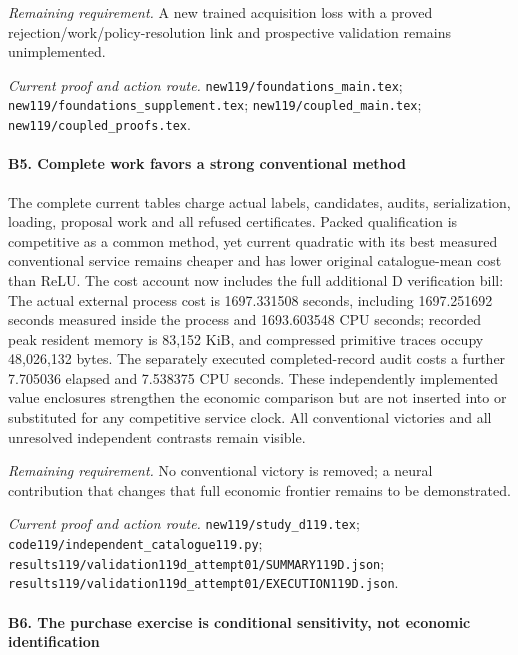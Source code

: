 \par\emph{Remaining requirement.} A new trained acquisition loss with a proved rejection/\allowbreak{}work/\allowbreak{}policy-resolution link and prospective validation remains unimplemented.

\par\emph{Current proof and action route.} \nolinkurl{new119/foundations_main.tex}; \nolinkurl{new119/foundations_supplement.tex}; \nolinkurl{new119/coupled_main.tex}; \nolinkurl{new119/coupled_proofs.tex}.

\paragraph{B5. Complete work favors a strong conventional method}

The complete current tables charge actual labels, candidates, audits, serialization, loading, proposal work and all refused certificates. Packed qualification is competitive as a common method, yet current quadratic with its best measured conventional service remains cheaper and has lower original catalogue-mean cost than ReLU. The cost account now includes the full additional D verification bill: The actual external process cost is 1697.331508 seconds, including 1697.251692 seconds measured inside the process and 1693.603548 CPU seconds; recorded peak resident memory is 83,152 KiB, and compressed primitive traces occupy 48,026,132 bytes. The separately executed completed-record audit costs a further 7.705036 elapsed and 7.538375 CPU seconds. These independently implemented value enclosures strengthen the economic comparison but are not inserted into or substituted for any competitive service clock. All conventional victories and all unresolved independent contrasts remain visible.

\par\emph{Remaining requirement.} No conventional victory is removed; a neural contribution that changes that full economic frontier remains to be demonstrated.

\par\emph{Current proof and action route.} \nolinkurl{new119/study_d119.tex}; \nolinkurl{code119/independent_catalogue119.py}; \nolinkurl{results119/validation119d_attempt01/SUMMARY119D.json}; \nolinkurl{results119/validation119d_attempt01/EXECUTION119D.json}.

\paragraph{B6. The purchase exercise is conditional sensitivity, not economic identification}

